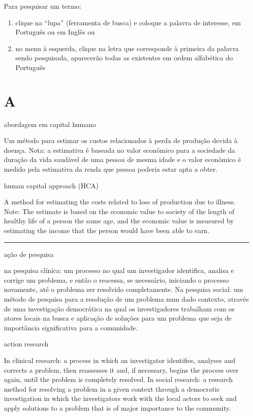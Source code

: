 \documentclass[
  openany]{book}
\begin{document}
Para pesquisar um termo:

\begin{enumerate}
\def\labelenumi{\alph{enumi})}
\item
  clique na ``lupa'' (ferramenta de busca) e coloque a palavra de interesse, em Português ou em Inglês ou
\item
  no menu à esquerda, clique na letra que corresponde à primeira da palavra sendo pesquisada, aparecerão todas as existentes em ordem alfabética do Português
\end{enumerate}

\hypertarget{a}{%
\chapter*{A}\label{a}}

abordagem em capital humano

Um método para estimar os custos relacionados à perda de produção devida à doença. Nota: a estimativa é baseada no valor econômico para a sociedade da duração da vida saudável de uma pessoa de mesma idade e o valor econômico é medido pela estimativa da renda que pessoa poderia estar apta a obter.

human capital approach (HCA)

A method for estimating the costs related to loss of production due to illness. Note: The estimate is based on the economic value to society of the length of healthy life of a person the same age, and the economic value is measured by estimating the income that the person would have been able to earn.

\begin{center}\rule{0.5\linewidth}{0.5pt}\end{center}

ação de pesquisa

na pesquisa clínica: um processo no qual um investigador identifica, analisa e corrige um problema, e então o reacessa, se necessário, iniciando o processo novamente, até o problema ser resolvido completamente. Na pesquisa social: um método de pesquisa para a resolução de um problema num dado contexto, através de uma investigação democrática na qual os investigadores trabalham com os atores locais na busca e aplicação de soluções para um problema que seja de importância significativa para a comunidade.

action research

In clinical research: a process in which an investigator identifies, analyses and corrects a problem, then reassesses it and, if necessary, begins the process over again, until the problem is completely resolved. In social research: a research method for resolving a problem in a given context through a democratic investigation in which the investigators work with the local actors to seek and apply solutions to a problem that is of major importance to the community.
\end{document}
